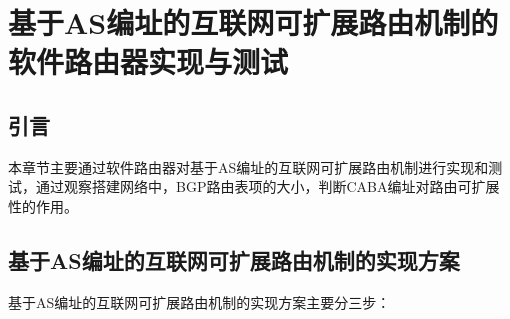 ﻿

\chapter{基于AS编址的互联网可扩展路由机制的软件路由器实现与测试}
\section{引言}

本章节主要通过软件路由器对基于AS编址的互联网可扩展路由机制进行实现和测试，通过观察搭建网络中，BGP路由表项的大小，判断CABA编址对路由可扩展性的作用。

\section{基于AS编址的互联网可扩展路由机制的实现方案}

基于AS编址的互联网可扩展路由机制的实现方案主要分三步：

